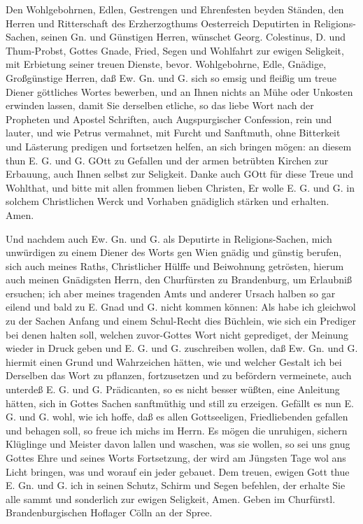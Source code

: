 Den Wohlgebohrnen, Edlen, Gestrengen und Ehrenfesten beyden Ständen, den Herren und Ritterschaft des Erzherzogthums Oesterreich Deputirten in Religions-Sachen, seinen Gn. und Günstigen Herren, wünschet Georg. Colestinus, D. und Thum-Probst,
Gottes Gnade, Fried, Segen und Wohlfahrt zur ewigen Seligkeit, mit Erbietung seiner treuen Dienste, bevor. Wohlgebohrne, Edle, Gnädige, Großgünstige Herren, daß Ew. Gn. und G. sich so emsig und fleißig um treue Diener göttliches Wortes bewerben, und an Ihnen nichts an Mühe oder Unkosten erwinden lassen, damit Sie derselben etliche, so das liebe Wort nach der Propheten und Apostel Schriften, auch Augspurgischer Confession, rein und lauter, und wie Petrus vermahnet, mit Furcht und Sanftmuth, ohne Bitterkeit und Lästerung predigen und fortsetzen helfen, an sich bringen mögen: an diesem thun E. G. und G. GOtt zu Gefallen und der armen betrübten Kirchen zur Erbauung, auch Ihnen selbst zur Seligkeit. Danke auch GOtt für diese Treue und Wohlthat, und bitte mit allen frommen lieben Christen, Er wolle E. G. und G. in solchem Christlichen Werck und Vorhaben gnädiglich stärken und erhalten. Amen.

Und nachdem auch Ew. Gn. und G. als Deputirte in Religions-Sachen, mich unwürdigen zu einem Diener des Worts gen Wien gnädig und günstig berufen, sich auch meines Raths, Christlicher Hülffe und Beiwohnung getrösten, hierum auch meinen Gnädigsten Herrn, den Churfürsten zu Brandenburg, um Erlaubniß ersuchen; ich aber meines tragenden Amts und anderer Ursach halben so gar eilend und bald zu E.
Gnad und G. nicht kommen können: Als habe ich gleichwol zu der Sachen Anfang und einem Schul-Recht dies Büchlein, wie sich ein Prediger bei denen halten soll, welchen zuvor-Gottes Wort nicht geprediget, der Meinung wieder in Druck geben und E. G. und G. zuschreiben wollen, daß Ew. Gn. und G. hiermit einen Grund und Wahrzeichen hätten, wie und welcher Gestalt ich bei Derselben das Wort zu pflanzen, fortzusetzen und zu befördern vermeinete, auch unterdeß E. G. und G. Prädicanten, so es nicht besser wüßten, eine Anleitung hätten, sich in Gottes Sachen sanftmüthig und still zu erzeigen. Gefällt es nun E. G. und G. wohl, wie ich hoffe, daß es allen Gottseeligen, Friedliebenden gefallen und behagen soll, so freue ich michs im Herrn. Es mögen die unruhigen, sichern Klüglinge und Meister davon lallen und waschen, was sie wollen, so sei uns gnug Gottes Ehre und seines Worts Fortsetzung, der wird am Jüngsten Tage wol ans Licht bringen, was und worauf ein jeder gebauet. Dem treuen, ewigen Gott thue E. Gn. und G. ich in seinen Schutz, Schirm und Segen befehlen, der erhalte Sie alle sammt und sonderlich zur ewigen Seligkeit, Amen. Geben im Churfürstl. Brandenburgischen Hoflager Cölln an der Spree.

